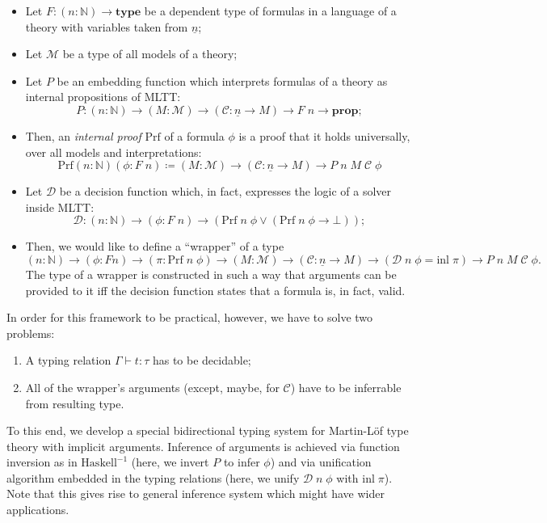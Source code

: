 \documentclass[manuscript,screen,review]{acmart}
\begin{document}
\begin{itemize}
  \item Let $F : (n : \mathbb{N}) \to \mathbf{type}$ be a dependent type of
    formulas in a language of a theory with variables taken from
    $\underline{n}$;
  \item Let $\mathcal{M}$ be a type of all models of a theory;
  \item Let $P$ be an embedding function which interprets formulas of a theory
    as internal propositions of MLTT:
    \[
      P : (n : \mathbb{N}) \to (M : \mathcal{M})
          \to (\mathcal{C} : \underline{n} \to M) \to F\;n \to \mathbf{prop};
    \]
  \item Then, an \textit{internal proof} $\mathrm{Prf}$ of a formula $\phi$ is a
    proof that it holds universally, over all models and interpretations:
    \[
      \mathrm{Prf}(n:\mathbb{N})(\phi:F\;n)\coloneq
      (M:\mathcal{M})\to(\mathcal{C}:\underline{n}\to M)
      \to P\;n\;M\;\mathcal{C}\;\phi
    \]
  \item Let $\mathcal{D}$ be a decision function which, in fact, expresses the
    logic of a solver inside MLTT:
    \[
      \mathcal{D} : (n : \mathbb{N}) \to (\phi : F\;n) \to
      (\mathrm{Prf}\;n\;\phi\lor(\mathrm{Prf}\;n\;\phi\to\bot));
    \]
  \item Then, we would like to define a ``wrapper'' of a type
    \[
      (n : \mathbb{N}) \to (\phi : F n) \to (\pi : \mathrm{Prf} \; n \; \phi)
          \to (M : \mathcal{M}) \to (\mathcal{C} : \underline{n} \to M)
          \to (\mathcal{D} \; n \; \phi = \mathrm{inl} \; \pi)
          \to P \; n \; M \; \mathcal{C} \; \phi.
    \]
    The type of a wrapper is constructed in such a way that arguments can be
    provided to it iff the decision function states that a formula is, in fact,
    valid.
\end{itemize}

In order for this framework to be practical, however, we have to solve two
problems:

\begin{enumerate}
  \item A typing relation $\Gamma \vdash t : \tau$ has to be decidable;
  \item All of the wrapper's arguments (except, maybe, for $\mathcal{C}$)
    have to be inferrable from resulting type.
\end{enumerate}

To this end, we develop a special bidirectional typing system \cite{bidir} for
Martin-L\"of type theory with implicit arguments. Inference of arguments is
achieved via function inversion as in $\mathrm{Haskell}^{-1}$ \cite{haskell}
(here, we invert $P$ to infer $\phi$) and via unification algorithm embedded in
the typing relations (here, we unify $\mathcal{D} \; n \; \phi$ with
$\mathrm{inl} \; \pi$). Note that this gives rise to general inference system
which might have wider applications.
\end{document}

